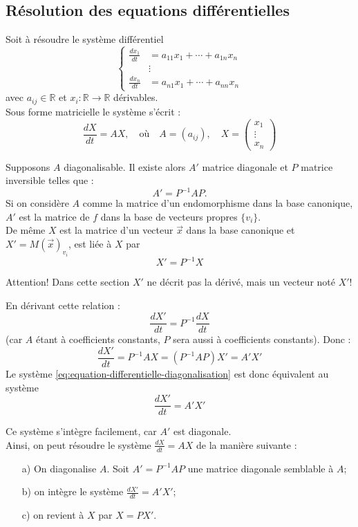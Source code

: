 \subsection{Résolution des equations différentielles}
Soit à résoudre le système différentiel
\[
\left\{
\begin{aligned}
\frac{dx_1}{dt} &= a_{11}x_1 + \cdots + a_{1n}x_n \\
&\vdots \\
\frac{dx_n}{dt} &= a_{n1}x_1 + \cdots + a_{nn}x_n
\end{aligned}
\right.
\]
avec \( a_{ij} \in \mathbb{R} \) et \( x_i : \mathbb{R} \rightarrow \mathbb{R} \) dérivables.\\

Sous forme matricielle le système s’écrit :
\begin{equation}\label{eq:equation-differentielle-diagonalisation}
\frac{dX}{dt} = AX, \quad \text{où} \quad A = (a_{ij}), \quad X = 
\begin{pmatrix}
x_1 \\
\vdots \\
x_n
\end{pmatrix}
\end{equation}

Supposons \( A \) diagonalisable. Il existe alors \( A' \) matrice diagonale et \( P \) matrice inversible telles que : 
\[
A' = P^{-1}AP.
\]
Si on considère \( A \) comme la matrice d’un endomorphisme dans la base canonique, \( A' \) est la matrice de \( f \) dans la base de vecteurs propres \( \{v_i\} \).\\
De même \( X \) est la matrice d’un vecteur \( \vec{x} \) dans la base canonique et \( X' = M(\vec{x})_{v_i} \), est liée à \( X \) par
\[
X' = P^{-1}X
\]
\begin{note}
   Attention! Dans cette section $X'$ ne décrit pas la dérivé, mais un vecteur noté  $X'$! 
\end{note}
En dérivant cette relation :
\[
\frac{dX'}{dt} = P^{-1} \frac{dX}{dt}
\]
(car \( A \) étant à coefficients constants, \( P \) sera aussi à coefficients constants). Donc :
\[
\frac{dX'}{dt} = P^{-1}AX = \left( P^{-1}AP \right) X' = A'X'
\]
Le système \ref{eq:equation-differentielle-diagonalisation} est donc équivalent au système
\[
\frac{dX'}{dt} = A'X'
\]

Ce système s’intègre facilement, car \( A' \) est diagonale.\\
Ainsi, on peut résoudre le système \( \frac{dX}{dt} = AX \) de la manière suivante :
\begin{enumerate}
    \item[a)] On diagonalise \( A \). Soit \( A' = P^{-1}AP \) une matrice diagonale semblable à \( A \);
    \item[b)] on intègre le système \( \frac{dX'}{dt} = A'X' \);
    \item[c)] on revient à \( X \) par \( X = PX' \).
\end{enumerate}


